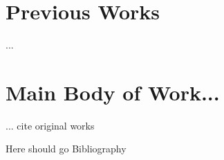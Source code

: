 \documentclass[12pt]{article}
\begin{document}
\section{Previous Works}
...

\section{Main Body of Work...}
... cite original works \cite{Original}


\newpage

Here should go Bibliography

\newpage

\end{document}
